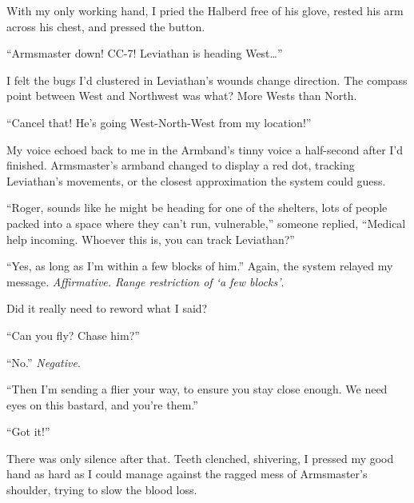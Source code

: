 With my only working hand, I pried the Halberd free of his glove, rested his arm across his chest, and pressed the button.



``Armsmaster down!  CC-7!  Leviathan is heading West\ldots''



I felt the bugs I'd clustered in Leviathan's wounds change direction.  The compass point between West and Northwest was what?  More Wests than North.



``Cancel that!  He's going West-North-West from my location!''



My voice echoed back to me in the Armband's tinny voice a half-second after I'd finished.  Armsmaster's armband changed to display a red dot, tracking Leviathan's movements, or the closest approximation the system could guess.



``Roger, sounds like he might be heading for one of the shelters, lots of people packed into a space where they can't run, vulnerable,'' someone replied, ``Medical help incoming.  Whoever this is, you can track Leviathan?''



``Yes, as long as I'm within a few blocks of him.''  Again, the system relayed my message. \emph{Affirmative.  Range restriction of `a few blocks'}.



Did it really need to reword what I said?



``Can you fly?  Chase him?''



``No.''  \emph{Negative}.



``Then I'm sending a flier your way, to ensure you stay close enough.  We need eyes on this bastard, and you're them.''



``Got it!''



There was only silence after that.  Teeth clenched, shivering, I pressed my good hand as hard as I could manage against the ragged mess of Armsmaster's shoulder, trying to slow the blood loss.





